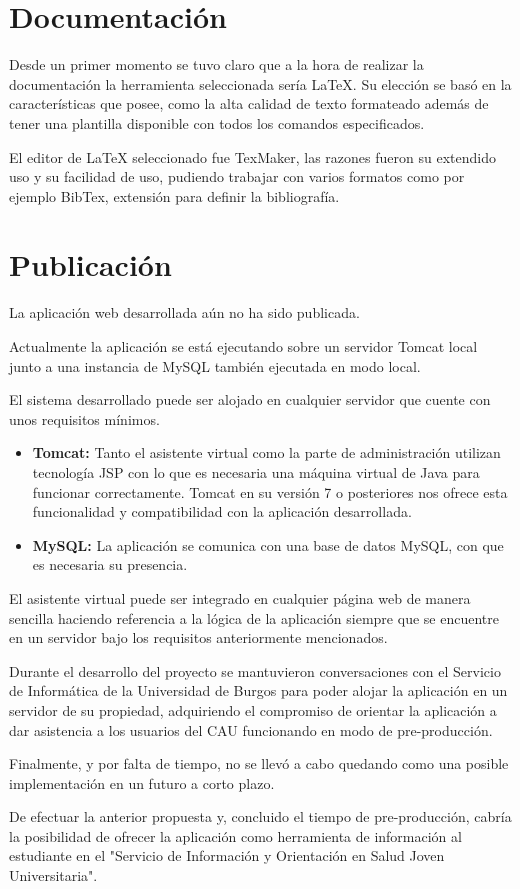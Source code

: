 \section{Documentación}

Desde un primer momento se tuvo claro que a la hora de realizar la documentación la herramienta seleccionada sería LaTeX. Su elección se basó en la características que posee, como la alta calidad de texto formateado además de tener una plantilla disponible con todos los comandos especificados.

El editor de LaTeX seleccionado fue TexMaker, las razones fueron su extendido uso y su facilidad de uso, pudiendo trabajar con varios formatos como por ejemplo BibTex, extensión para definir la bibliografía.

\section{Publicación}

La aplicación web desarrollada aún no ha sido publicada.

Actualmente la aplicación se está ejecutando sobre un servidor Tomcat local junto a una instancia de MySQL también ejecutada en modo local.

El sistema desarrollado puede ser alojado en cualquier servidor que cuente con unos requisitos mínimos.

\begin{itemize}
\tightlist
\item \textbf{Tomcat:} Tanto el asistente virtual como la parte de administración utilizan tecnología JSP con lo que es necesaria una máquina virtual de Java para funcionar correctamente. Tomcat en su versión 7 o posteriores nos ofrece esta funcionalidad y compatibilidad con la aplicación desarrollada.
\item \textbf{MySQL:} La aplicación se comunica con una base de datos MySQL, con que es necesaria su presencia.
\end{itemize}

El asistente virtual puede ser integrado en cualquier página web de manera sencilla haciendo referencia a la lógica de la aplicación siempre que se encuentre en un servidor bajo los requisitos anteriormente mencionados.

Durante el desarrollo del proyecto se mantuvieron conversaciones con el Servicio de Informática de la Universidad de Burgos para poder alojar la aplicación en un servidor de su propiedad, adquiriendo el compromiso de orientar la aplicación a dar asistencia a los usuarios del CAU funcionando en modo de pre-producción.

Finalmente, y por falta de tiempo, no se llevó a cabo quedando como una posible implementación en un futuro a corto plazo.

De efectuar la anterior propuesta y, concluido el tiempo de pre-producción, cabría la posibilidad de ofrecer la aplicación como herramienta de información al estudiante en el "Servicio de Información y Orientación en Salud Joven Universitaria".